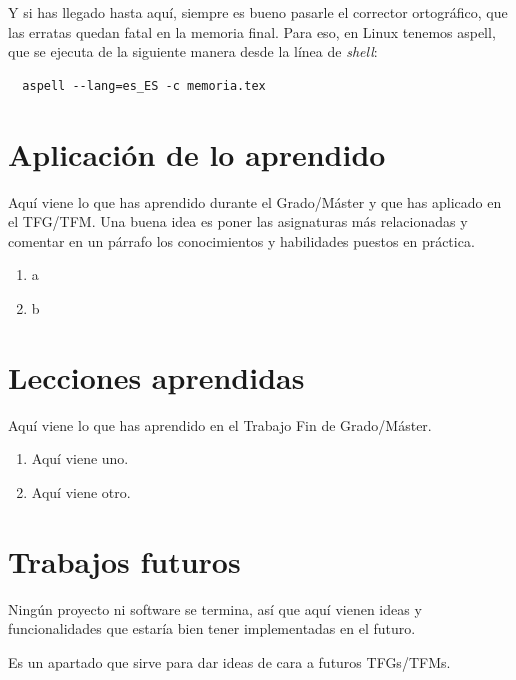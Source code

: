 \documentclass[a4paper, 12pt]{book}
\begin{document}
Y si has llegado hasta aquí, siempre es bueno pasarle el corrector ortográfico, que las erratas quedan fatal en la memoria final.
Para eso, en Linux tenemos aspell, que se ejecuta de la siguiente manera desde la línea de \emph{shell}:

\begin{verbatim}
  aspell --lang=es_ES -c memoria.tex
\end{verbatim}

\section{Aplicación de lo aprendido}
\label{sec:aplicacion}

Aquí viene lo que has aprendido durante el Grado/Máster y que has aplicado en el TFG/TFM. Una buena idea es poner las asignaturas más relacionadas y comentar en un párrafo los conocimientos y habilidades puestos en práctica.

\begin{enumerate}
  \item a
  \item b
\end{enumerate}


\section{Lecciones aprendidas}
\label{sec:lecciones_aprendidas}

Aquí viene lo que has aprendido en el Trabajo Fin de Grado/Máster.

\begin{enumerate}
  \item Aquí viene uno.
  \item Aquí viene otro.
\end{enumerate}


\section{Trabajos futuros}
\label{sec:trabajos_futuros}

Ningún proyecto ni software se termina, así que aquí vienen ideas y funcionalidades que estaría bien tener implementadas en el futuro.

Es un apartado que sirve para dar ideas de cara a futuros TFGs/TFMs.


\end{document}
